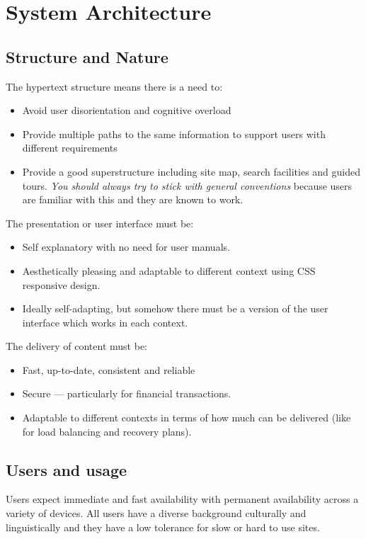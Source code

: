 \section{System Architecture}\label{sec:system_architecture}

\subsection{Structure and Nature}\label{sub:structure_and_nature}

The hypertext structure means there is a need to:
\begin{itemize}
    \item Avoid user disorientation and cognitive overload
    \item Provide multiple paths to the same information to support users with different requirements
    \item Provide a good superstructure including site map, search facilities and guided tours.
          \emph{You should always try to stick with general conventions} because users are familiar with this and they are known to work.
\end{itemize}
The presentation or user interface must be:
\begin{itemize}
    \item Self explanatory with no need for user manuals.
    \item Aesthetically pleasing and adaptable to different context using CSS responsive design.
    \item Ideally self-adapting, but somehow there must be a version of the user interface which works in each context.
\end{itemize}
The delivery of content must be:
\begin{itemize}
    \item Fast, up-to-date, consistent and reliable
    \item Secure --- particularly for financial transactions.
    \item Adaptable to different contexts in terms of how much can be delivered (like for load balancing and recovery plans).
\end{itemize}

\subsection{Users and usage}\label{sub:users_and_usage}

Users expect immediate and fast availability with permanent availability across a variety of devices.
All users have a diverse background culturally and linguistically and they have a low tolerance for slow or hard to use sites.

